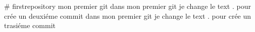# firstrepository
mon premier git 
dans mon premier git je change le text . pour crée un deuxiéme commit
dans mon premier git je change le text . pour crée un trasiéme commit
